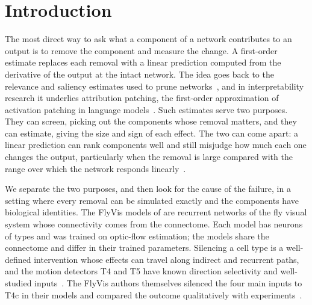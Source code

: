 \section{Introduction}
\label{sec:intro}

The most direct way to ask what a component of a network contributes to an output is to remove the component and measure the change. A first-order estimate replaces each removal with a linear prediction computed from the derivative of the output at the intact network. The idea goes back to the relevance and saliency estimates used to prune networks~\citep{mozer1989skeletonization,lecun1990optimal,molchanov2017pruning,molchanov2019importance}, and in interpretability research it underlies attribution patching, the first-order approximation of activation patching in language models~\citep{nanda2023attribution,syed2024attribution,kramar2024atp,hanna2024faith}. Such estimates serve two purposes. They can screen, picking out the components whose removal matters, and they can estimate, giving the size and sign of each effect. The two can come apart: a linear prediction can rank components well and still misjudge how much each one changes the output, particularly when the removal is large compared with the range over which the network responds linearly~\citep{nanda2023attribution,zhang2026attribution}.

We separate the two purposes, and then look for the cause of the failure, in a setting where every removal can be simulated exactly and the components have biological identities. The FlyVis models of \citet{lappalainen2024connectome} are \NModels{} recurrent networks of the fly visual system whose connectivity comes from the connectome. Each model has \NetNodes{} neurons of \NetTypes{} types and was trained on optic-flow estimation; the models share the connectome and differ in their trained parameters. Silencing a cell type is a well-defined intervention whose effects can travel along indirect and recurrent paths, and the motion detectors T4 and T5 have known direction selectivity and well-studied inputs~\citep{borst2020fly,strother2017emergence,ammer2015functional,serbe2016comprehensive}. The FlyVis authors themselves silenced the four main inputs to T4c in their models and compared the outcome qualitatively with experiments~\citep{lappalainen2024review}.

